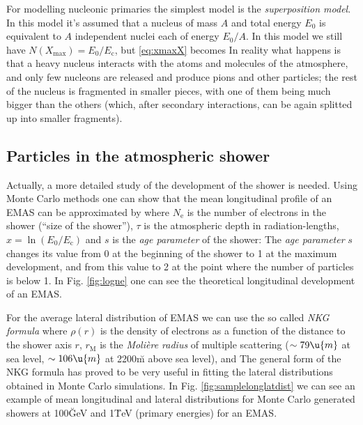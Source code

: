 For modelling nucleonic primaries the simplest model is the
\emph{superposition model}. In this model it's assumed that a nucleus
of mass $A$ and total energy $E_0$ is equivalent to $A$ independent
nuclei each of energy $E_0/A$. In this model we still have
$N(X_{\mathrm{max}}) = E_0 / E_{\mathrm{c}}$, but \eqref{eq:xmaxX}
becomes
%
\NXsimpleHadeq
%
In reality what happens is that a heavy nucleus interacts with the
atoms and molecules of the atmosphere, and only few nucleons are
released and produce pions and other particles; the rest of the
nucleus is fragmented in smaller pieces, with one of them being much
bigger than the others (which, after secondary interactions, can be
again splitted up into smaller fragments).

\lognefig

\subsection{Particles in the atmospheric shower}

Actually, a more detailed study of the development of the shower is
needed. Using Monte Carlo methods one can show that the mean
longitudinal profile of an EMAS can be approximated by
%
\Neeq
%
where $N_{\mathrm{e}}$ is the number of electrons in the shower
(``size of the shower''), $\tau$ is the atmospheric depth in
radiation-lengths, $x=\ln(E_0/E_{\mathrm{c}})$ and $s$ is the
\emph{age parameter} of the shower:
%
\ageeq
%
The \emph{age parameter} $s$ changes its value from 0 at the beginning
of the shower to 1 at the maximum development, and from this value to
2 at the point where the number of particles is below 1. In Fig.
\ref{fig:logne} one can see the theoretical longitudinal development
of an EMAS.

\samplelonglatdistfig

For the average lateral distribution of EMAS we can use the so called
\emph{NKG formula}
%
\NKGeq
%
where $\rho(r)$ is the density of electrons as a function of the
distance to the shower axis $r$, $r_{\mathrm{M}}$ is the
\emph{Moli{\`e}re radius} of multiple scattering ($\sim 79\u{m}$ at sea
level, $\sim 106\u{m}$ at 2200\u{m} above sea level), and
%
\fsreq
%
The general form of the NKG formula has proved to be very useful in
fitting the lateral distributions obtained in Monte Carlo
simulations. In Fig. \ref{fig:samplelonglatdist} we can see an example of
mean longitudinal and lateral distributions for Monte Carlo generated
showers at 100\u{GeV} and 1\u{TeV} (primary energies) for an EMAS.

